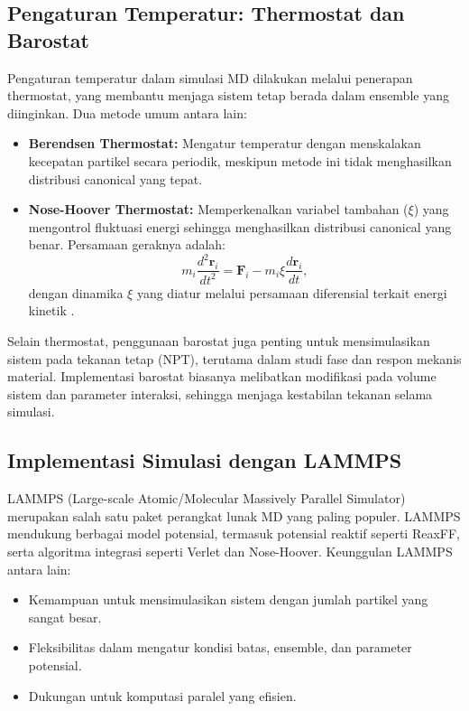 \subsection{Pengaturan Temperatur: Thermostat dan Barostat}
Pengaturan temperatur dalam simulasi MD dilakukan melalui penerapan thermostat, yang membantu menjaga sistem tetap berada dalam ensemble yang diinginkan. Dua metode umum antara lain:
\begin{itemize}
    \item \textbf{Berendsen Thermostat:} Mengatur temperatur dengan menskalakan kecepatan partikel secara periodik, meskipun metode ini tidak menghasilkan distribusi canonical yang tepat.
    \item \textbf{Nose-Hoover Thermostat:} Memperkenalkan variabel tambahan (\(\xi\)) yang mengontrol fluktuasi energi sehingga menghasilkan distribusi canonical yang benar. Persamaan geraknya adalah:
    \begin{equation}
        m_i \frac{d^2 \mathbf{r}_i}{dt^2} = \mathbf{F}_i - m_i \xi \frac{d\mathbf{r}_i}{dt},
    \end{equation}
    dengan dinamika \(\xi\) yang diatur melalui persamaan diferensial terkait energi kinetik \citep{martyna_nosehoover_1992}.
\end{itemize}

Selain thermostat, penggunaan barostat juga penting untuk mensimulasikan sistem pada tekanan tetap (NPT), terutama dalam studi fase dan respon mekanis material. Implementasi barostat biasanya melibatkan modifikasi pada volume sistem dan parameter interaksi, sehingga menjaga kestabilan tekanan selama simulasi.

\subsection{Implementasi Simulasi dengan LAMMPS}
LAMMPS (Large-scale Atomic/Molecular Massively Parallel Simulator) merupakan salah satu paket perangkat lunak MD yang paling populer. LAMMPS mendukung berbagai model potensial, termasuk potensial reaktif seperti ReaxFF, serta algoritma integrasi seperti Verlet dan Nose-Hoover. Keunggulan LAMMPS antara lain:
\begin{itemize}
    \item Kemampuan untuk mensimulasikan sistem dengan jumlah partikel yang sangat besar.
    \item Fleksibilitas dalam mengatur kondisi batas, ensemble, dan parameter potensial.
    \item Dukungan untuk komputasi paralel yang efisien.
\end{itemize}

